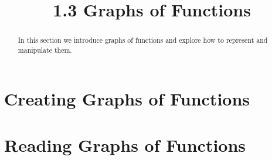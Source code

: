 \documentclass[handout]{ximera}
\title{1.3 Graphs of Functions}
\begin{document}
\begin{abstract}
In this section we introduce graphs of functions and explore how to represent and manipulate them.
\end{abstract}

\maketitle

\section{Creating Graphs of Functions}

\section{Reading Graphs of Functions}
\end{document}
